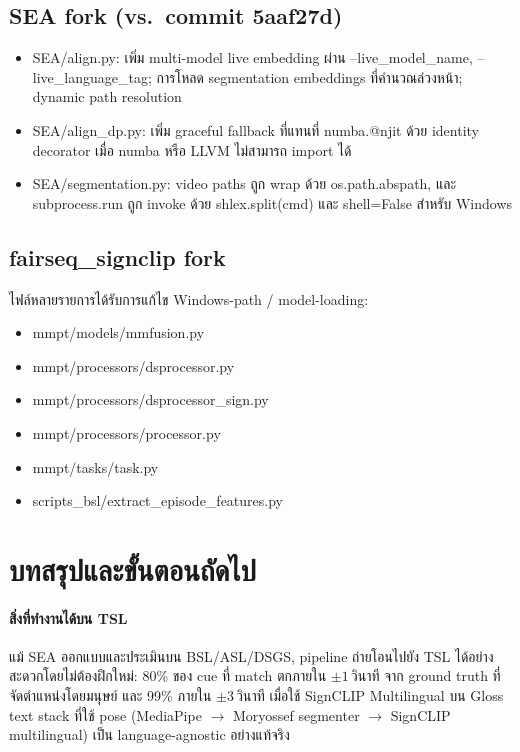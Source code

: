 \documentclass[11pt,a4paper]{article}
\def\texttt#1{#1}%
\def\textbf#1{#1}%
\begin{document}
\subsection{SEA fork (vs.\ commit \texttt{5aaf27d})}
\begin{itemize}[leftmargin=1.5em]
\item \textbf{\texttt{SEA/align.py}}: เพิ่ม multi-model live embedding ผ่าน
      \texttt{--live\_model\_name}, \texttt{--live\_language\_tag};
      การโหลด segmentation embeddings ที่คำนวณล่วงหน้า;
      dynamic path resolution
\item \textbf{\texttt{SEA/align\_dp.py}}: เพิ่ม graceful fallback
      ที่แทนที่ \texttt{numba.@njit} ด้วย identity decorator
      เมื่อ numba หรือ LLVM ไม่สามารถ import ได้
\item \textbf{\texttt{SEA/segmentation.py}}: video paths ถูก wrap ด้วย
      \texttt{os.path.abspath}, และ \texttt{subprocess.run} ถูก invoke ด้วย
      \texttt{shlex.split(cmd)} และ \texttt{shell=False} สำหรับ Windows
\end{itemize}

\subsection{fairseq\_signclip fork}
ไฟล์หลายรายการได้รับการแก้ไข Windows-path / model-loading:
\begin{itemize}[leftmargin=1.5em,itemsep=0pt]
  \item \texttt{mmpt/models/mmfusion.py}
  \item \texttt{mmpt/processors/dsprocessor.py}
  \item \texttt{mmpt/processors/dsprocessor\_sign.py}
  \item \texttt{mmpt/processors/processor.py}
  \item \texttt{mmpt/tasks/task.py}
  \item \texttt{scripts\_bsl/extract\_episode\_features.py}
\end{itemize}


\section{บทสรุปและขั้นตอนถัดไป}

\paragraph{สิ่งที่ทำงานได้บน TSL}
แม้ SEA ออกแบบและประเมินบน BSL/ASL/DSGS, pipeline ถ่ายโอนไปยัง TSL
ได้อย่างสะดวกโดยไม่ต้องฝึกใหม่: 80\% ของ cue ที่ match ตกภายใน $\pm 1$\,วินาที
จาก ground truth ที่จัดตำแหน่งโดยมนุษย์ และ 99\% ภายใน $\pm 3$\,วินาที
เมื่อใช้ SignCLIP Multilingual บน Gloss text
stack ที่ใช้ pose (MediaPipe $\to$ Moryossef segmenter $\to$ SignCLIP multilingual)
เป็น language-agnostic อย่างแท้จริง
\end{document}
